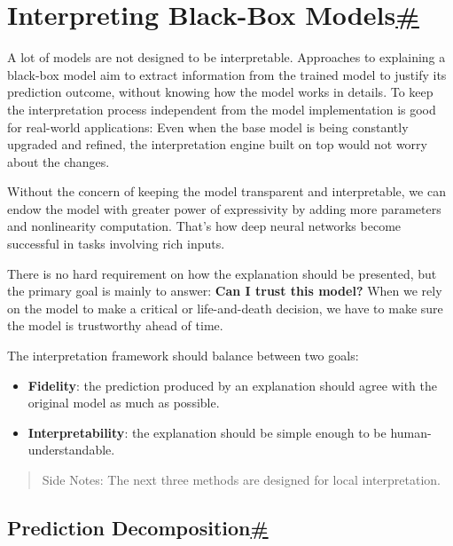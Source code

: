 \section{\texorpdfstring{Interpreting Black-Box Models\hyperref[interpreting-black-box-models]{\#}}{Interpreting Black-Box Models\#}}\label{interpreting-black-box-models}

A lot of models are not designed to be interpretable. Approaches to explaining a black-box model aim to extract information from the trained model to justify its prediction outcome, without knowing how the model works in details. To keep the interpretation process independent from the model implementation is good for real-world applications: Even when the base model is being constantly upgraded and refined, the interpretation engine built on top would not worry about the changes.

Without the concern of keeping the model transparent and interpretable, we can endow the model with greater power of expressivity by adding more parameters and nonlinearity computation. That's how deep neural networks become successful in tasks involving rich inputs.

There is no hard requirement on how the explanation should be presented, but the primary goal is mainly to answer: \textbf{Can I trust this model?} When we rely on the model to make a critical or life-and-death decision, we have to make sure the model is trustworthy ahead of time.

The interpretation framework should balance between two goals:

\begin{itemize}
\tightlist
\item
  \textbf{Fidelity}: the prediction produced by an explanation should agree with the original model as much as possible.
\item
  \textbf{Interpretability}: the explanation should be simple enough to be human-understandable.
\end{itemize}

\begin{quote}
Side Notes: The next three methods are designed for local interpretation.
\end{quote}

\subsection{\texorpdfstring{Prediction Decomposition\hyperref[prediction-decomposition]{\#}}{Prediction Decomposition\#}}\label{prediction-decomposition}

